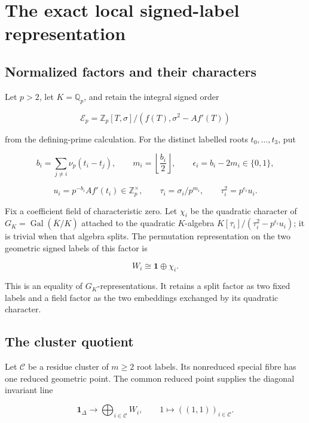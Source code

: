 \section{The exact local signed-label
representation}\label{the-exact-local-signed-label-representation}

\subsection{Normalized factors and their
characters}\label{normalized-factors-and-their-characters}

Let \(p>2\), let \(K=\mathbb Q_p\), and retain the integral signed order

\[
\mathscr E_p=\mathbb Z_p[T,\sigma]/(f(T),\sigma^2-Af'(T))
\]

from the defining-prime calculation. For the distinct labelled roots
\(t_0,\ldots,t_3\), put

\[
b_i=\sum_{j\ne i}\nu_p(t_i-t_j),\qquad
m_i=\left\lfloor\frac{b_i}{2}\right\rfloor,\qquad
\epsilon_i=b_i-2m_i\in\{0,1\},
\]

\[
u_i=p^{-b_i}Af'(t_i)\in\mathbb Z_p^\times,\qquad
\tau_i=\sigma_i/p^{m_i},\qquad
\tau_i^2=p^{\epsilon_i}u_i.
\]

Fix a coefficient field of characteristic zero. Let \(\chi_i\) be the
quadratic character of \(G_K=\operatorname{Gal}(\overline K/K)\)
attached to the quadratic \(K\)-algebra
\(K[\tau_i]/(\tau_i^2-p^{\epsilon_i}u_i)\); it is trivial when that
algebra splits. The permutation representation on the two geometric
signed labels of this factor is

\[
W_i\cong\mathbf1\oplus\chi_i.
\]

This is an equality of \(G_K\)-representations. It retains a split
factor as two fixed labels and a field factor as the two embeddings
exchanged by its quadratic character.

\subsection{The cluster quotient}\label{the-cluster-quotient}

Let \(\mathcal C\) be a residue cluster of \(m\ge2\) root labels. Its
nonreduced special fibre has one reduced geometric point. The common
reduced point supplies the diagonal invariant line

\[
\mathbf1_\Delta\longrightarrow
\bigoplus_{i\in\mathcal C}W_i,
\qquad
1\longmapsto((1,1))_{i\in\mathcal C}.
\]

